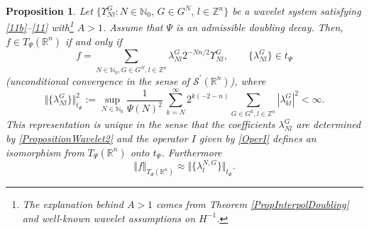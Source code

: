 \documentclass[11pt, a4paper,leqno]{amsart}
\theoremstyle{plain}
\newtheorem{proposition}{Proposition}
\numberwithin{equation}{section}
\theoremstyle{definition}
\theoremstyle{remark}
\begin{document}
\begin{proposition}
\label{PropositionWaveletT} Let $\{\Upsilon^G_{N l}:N\in\mathbb{N}%
_{0},\,G\in G^{N},\,l\in\mathbb{Z}^{n}\}$ be a wavelet system satisfying
\eqref{11b}--\eqref{11} with\footnote{The explanation behind $A> 1$ comes from Theorem \ref{PropInterpolDoubling} and  well-known wavelet assumptions on $H^{-1}$.} $A>1$. Assume that $\Psi$ is an admissible doubling decay. Then, $f\in T_{\Psi}%
(\mathbb{R}^{n})$ if and only if
\[
f=\sum_{N\in\mathbb{N}_{0},G\in G^{N},l\in\mathbb{Z}^{n}}\lambda_{N l}%
^{G}2^{-Nn/2}\Upsilon_{N l}^{G},\qquad\{\lambda_{N l}^{G}\}\in t_{\Psi}%
\]
(unconditional convergence in the sense of $\mathcal{S}^{\prime}%
(\mathbb{R}^{n})$), where
\begin{equation}
\Vert\{\lambda^{G}_{N l}\}\Vert_{t_{\Psi}}^{2} :=\sup_{N\in\mathbb{N}_{0}}%
\frac{1}{\Psi(N)^{2}}\,\sum_{k=N}^{\infty}2^{k(-2-n)}\sum_{G\in G^{k}%
,l\in\mathbb{Z}^{n}}|\lambda_{k l}^{G}|^{2}<\infty. \label{Deft}%
\end{equation}
This representation is unique in the sense that the coefficients $\lambda
_{N l}^{G}$ are determined by \eqref{PropositionWavelet2} and the operator $I$
given by \eqref{OperI} defines an isomorphism from $T_{\Psi}(\mathbb{R}^{n})$
onto $t_{\Psi}$. Furthermore
\begin{equation}
\Vert f\Vert_{T_{\Psi}(\mathbb{R}^{n})}\approx\Vert\{\lambda_{l}^{N,G}%
\}\Vert_{t_{\Psi}}. \label{vanilla2}%
\end{equation}

\end{proposition}
\end{document}
